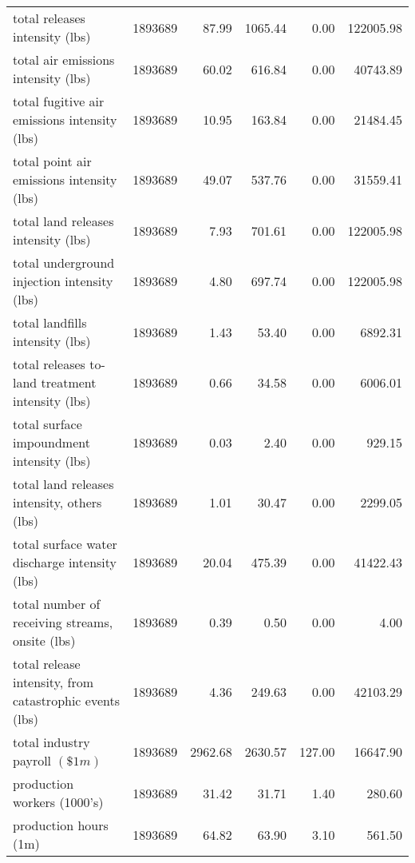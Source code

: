 \begin{table}[H]
{\begin{tabular}{lrrrrr}
            total releases intensity (lbs)                          & 1893689 & 87.99     & 1065.44    & 0.00    & 122005.98  \\
            total air emissions intensity (lbs)                     & 1893689 & 60.02     & 616.84     & 0.00    & 40743.89   \\
            total fugitive air emissions intensity (lbs)            & 1893689 & 10.95     & 163.84     & 0.00    & 21484.45   \\
            total point air emissions intensity (lbs)               & 1893689 & 49.07     & 537.76     & 0.00    & 31559.41   \\
            total land releases intensity (lbs)                     & 1893689 & 7.93      & 701.61     & 0.00    & 122005.98  \\
            total underground injection intensity (lbs)             & 1893689 & 4.80      & 697.74     & 0.00    & 122005.98  \\
            total landfills intensity (lbs)                         & 1893689 & 1.43      & 53.40      & 0.00    & 6892.31    \\
            total releases to-land treatment intensity (lbs)        & 1893689 & 0.66      & 34.58      & 0.00    & 6006.01    \\
            total surface impoundment intensity (lbs)               & 1893689 & 0.03      & 2.40       & 0.00    & 929.15     \\
            total land releases intensity, others (lbs)             & 1893689 & 1.01      & 30.47      & 0.00    & 2299.05    \\
            total surface water discharge intensity (lbs)           & 1893689 & 20.04     & 475.39     & 0.00    & 41422.43   \\
            total number of receiving streams, onsite (lbs)         & 1893689 & 0.39      & 0.50       & 0.00    & 4.00       \\
            total release intensity, from catastrophic events (lbs) & 1893689 & 4.36      & 249.63     & 0.00   & 42103.29  \\
            total industry payroll $(\$1m)$                         & 1893689 & 2962.68   & 2630.57    & 127.00  & 16647.90   \\
            production workers (1000's)                             & 1893689 & 31.42     & 31.71      & 1.40    & 280.60     \\
            production hours (1m)                                   & 1893689 & 64.82     & 63.90      & 3.10    & 561.50     \\

\end{tabular}}
\end{table}

